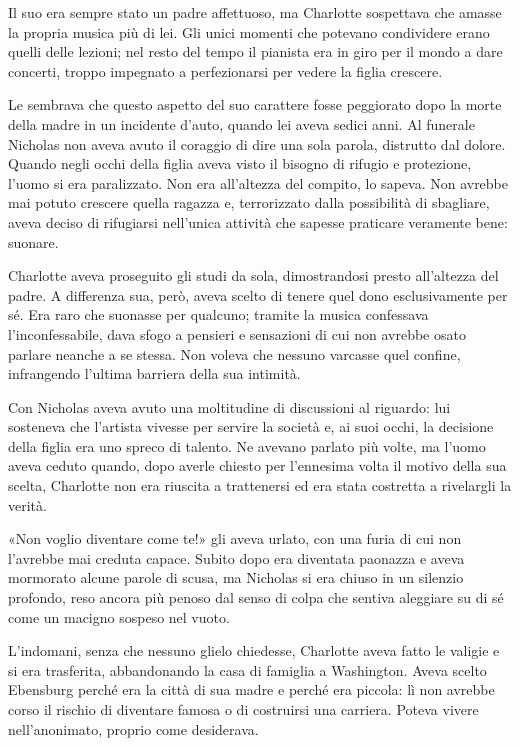 \documentclass[a4paper,oneside,11pt]{memoir}
\begin{document}
Il suo era sempre stato un padre affettuoso, ma Charlotte sospettava che amasse
la propria musica più di lei. Gli unici momenti che potevano condividere erano
quelli delle lezioni; nel resto del tempo il pianista era in giro per il mondo a
dare concerti, troppo impegnato a perfezionarsi per vedere la figlia crescere.

Le sembrava che questo aspetto del suo carattere fosse peggiorato dopo la morte
della madre in un incidente d'auto, quando lei aveva sedici anni. Al funerale
Nicholas non aveva avuto il coraggio di dire una sola parola, distrutto dal
dolore. Quando negli occhi della figlia aveva visto il bisogno di rifugio e
protezione, l'uomo si era paralizzato. Non era all'altezza del compito, lo
sapeva. Non avrebbe mai potuto crescere quella ragazza e, terrorizzato dalla
possibilità di sbagliare, aveva deciso di rifugiarsi nell'unica attività che
sapesse praticare veramente bene: suonare.

Charlotte aveva proseguito gli studi da sola, dimostrandosi presto all'altezza
del padre. A differenza sua, però, aveva scelto di tenere quel dono
esclusivamente per sé. Era raro che suonasse per qualcuno; tramite la musica
confessava l'inconfessabile, dava sfogo a pensieri e sensazioni di cui non
avrebbe osato parlare neanche a se stessa. Non voleva che nessuno varcasse quel
confine, infrangendo l'ultima barriera della sua intimità.

Con Nicholas aveva avuto una moltitudine di discussioni al riguardo: lui
sosteneva che l'artista vivesse per servire la società e, ai suoi occhi, la
decisione della figlia era uno spreco di talento. Ne avevano parlato più volte,
ma l'uomo aveva ceduto quando, dopo averle chiesto per l'ennesima volta il
motivo della sua scelta, Charlotte non era riuscita a trattenersi ed era stata
costretta a rivelargli la verità.

«Non voglio diventare come te!» gli aveva urlato, con una furia di cui non
l'avrebbe mai creduta capace. Subito dopo era diventata paonazza e aveva
mormorato alcune parole di scusa, ma Nicholas si era chiuso in un silenzio
profondo, reso ancora più penoso dal senso di colpa che sentiva aleggiare su di
sé come un macigno sospeso nel vuoto.

L'indomani, senza che nessuno glielo chiedesse, Charlotte aveva fatto le valigie
e si era trasferita, abbandonando la casa di famiglia a Washington. Aveva scelto
Ebensburg perché era la città di sua madre e perché era piccola: lì non avrebbe
corso il rischio di diventare famosa o di costruirsi una carriera. Poteva vivere
nell'anonimato, proprio come desiderava.
\end{document}
